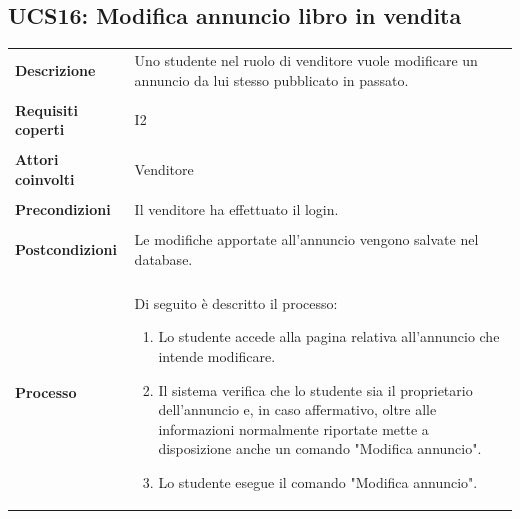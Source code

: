 \documentclass[10pt,a4paper]{report}
\begin{document}
	\subsection{UCS16: Modifica annuncio libro in vendita}
	\begin{tabular}{lp{}}
		\textbf{Descrizione}&Uno studente nel ruolo di venditore vuole modificare un annuncio da lui stesso pubblicato in passato.\\
		\\
		\textbf{Requisiti coperti}&I2\\
		\\
		\textbf{Attori coinvolti}&Venditore\\
		\\
		\textbf{Precondizioni}&Il venditore ha effettuato il login.\\
		\\
		\textbf{Postcondizioni}&Le modifiche apportate all'annuncio vengono salvate nel database.\\
		\\
		\textbf{Processo}&Di seguito è descritto il processo:
		\begin{enumerate}
			\item Lo studente accede alla pagina relativa all'annuncio che intende modificare.
			\item Il sistema verifica che lo studente sia il proprietario dell'annuncio e, in caso affermativo, oltre alle informazioni normalmente riportate mette a disposizione anche un comando "Modifica annuncio".
			\item Lo studente esegue il comando "Modifica annuncio".
			

\end{enumerate}
\end{tabular}
\end{document}
